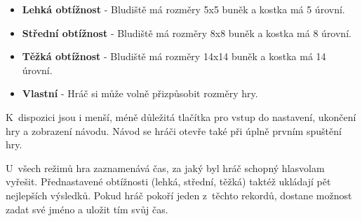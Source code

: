 \begin{itemize}
  \item \textbf{Lehká obtížnost} - Bludiště má rozměry 5x5 buněk a kostka má 5 úrovní.
  \item \textbf{Střední obtížnost} - Bludiště má rozměry 8x8 buněk a kostka má 8 úrovní.
  \item \textbf{Těžká obtížnost} - Bludiště má rozměry 14x14 buněk a kostka má 14 úrovní.
  \item \textbf{Vlastní} - Hráč si může volně přizpůsobit rozměry hry.
\end{itemize}

K~dispozici jsou i menší, méně důležitá tlačítka pro vstup do nastavení, ukončení hry a zobrazení návodu. Návod se hráči otevře také při úplně prvním spuštění hry.

U~všech režimů hra zaznamenává čas, za jaký byl hráč schopný hlasvolam vyřešit. Přednastavené obtížnosti (lehká, střední, těžká) taktéž ukládají pět nejlepších výsledků. Pokud hráč pokoří jeden z~těchto rekordů, dostane možnost zadat své jméno a uložit tím svůj čas.